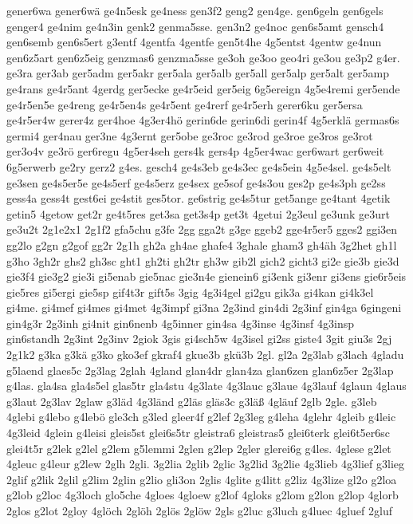 {gener6wa
gener6wä
ge4n5esk
ge4ness
gen3f2
geng2
gen4ge.
gen6geln
gen6gels
genger4
ge4nim
ge4n3in
genk2
genma5sse.
gen3n2
ge4noc
gen6s5amt
gensch4
gen6semb
gen6s5ert
g3entf
4gentfa
4gentfe
gen5t4he
4g5entst
4gentw
ge4nun
gen6z5art
gen6z5eig
genzmas6
genzma5sse
ge3oh
ge3oo
geo4ri
ge3ou
ge3p2
g4er.
ge3ra
ger3ab
ger5adm
ger5akr
ger5ala
ger5alb
ger5all
ger5alp
ger5alt
ger5amp
ge4rans
ge4r5ant
4gerdg
ger5ecke
ge4r5eid
ger5eig
6g5ereign
4g5e4remi
ger5ende
ge4r5en5e
ge4reng
ge4r5en4s
ge4r5ent
ge4rerf
ge4r5erh
gerer6ku
ger5ersa
ge4r5er4w
gerer4z
ger4hoe
4g3er4hö
gerin6de
gerin6di
gerin4f
4g5erklä
germas6s
germi4
ger4nau
ger3ne
4g3ernt
ger5obe
ge3roc
ge3rod
ge3roe
ge3ros
ge3rot
ger3o4v
ge3rö
ger6regu
4g5er4seh
gers4k
gers4p
4g5er4wac
ger6wart
ger6weit
6g5erwerb
ge2ry
gerz2
g4es.
gesch4
ge4s3eb
ge4s3ec
ge4s5ein
4g5e4sel.
ge4s5elt
ge3sen
ge4s5er5e
ge4s5erf
ge4s5erz
ge4sex
ge5sof
ge4s3ou
ges2p
ge4s3ph
ge2ss
gess4a
gess4t
gest6ei
ge4stit
ges5tor.
ge6strig
ge4s5tur
get5ange
ge4tant
4getik
getin5
4getow
get2r
ge4t5res
get3sa
get3s4p
get3t
4getui
2g3eul
ge3unk
ge3urt
ge3u2t
2g1e2x1
2g1f2
gfa5chu
g3fe
2gg
gga2t
g3ge
ggeb2
gge4r5er5
gges2
ggi3en
gg2lo
g2gn
g2gof
gg2r
2g1h
gh2a
gh4ae
ghafe4
3ghale
gham3
gh4äh
3g2het
gh1l
g3ho
3gh2r
ghs2
gh3sc
ght1
gh2ti
gh2tr
gh3w
gib2l
gich2
gicht3
gi2e
gie3b
gie3d
gie3f4
gie3g2
gie3i
gi5enab
gie5nac
gie3n4e
gienein6
gi3enk
gi3enr
gi3ens
gie6r5eis
gie5res
gi5ergi
gie5sp
gif4t3r
gift5s
3gig
4g3i4gel
gi2gu
gik3a
gi4kan
gi4k3el
gi4me.
gi4mef
gi4mes
gi4met
4g3impf
gi3na
2g3ind
gin4di
2g3inf
gin4ga
6gingeni
gin4g3r
2g3inh
gi4nit
gin6nenb
4g5inner
gin4sa
4g3inse
4g3insf
4g3insp
gin6standh
2g3int
2g3inv
2giok
3gis
gi4sch5w
4g3isel
gi2ss
giste4
3git
giu3s
2gj
2g1k2
g3ka
g3kä
g3ko
gko3ef
gkraf4
gkue3b
gkü3b
2gl.
gl2a
2g3lab
g3lach
4gladu
g5laend
glaes5c
2g3lag
2glah
4gland
glan4dr
glan4za
glan6zen
glan6z5er
2g3lap
g4las.
gla4sa
gla4s5el
glas5tr
gla4stu
4g3late
4g3lauc
g3laue
4g3lauf
4glaun
4glaus
g3laut
2g3lav
2glaw
g3läd
4g3länd
g2läs
gläs3c
g3läß
4gläuf
2glb
2gle.
g3leb
4glebi
g4lebo
g4lebö
gle3ch
g3led
gleer4f
g2lef
2g3leg
g4leha
4glehr
4gleib
g4leic
4g3leid
4glein
g4leisi
gleis5st
glei6s5tr
gleistra6
gleistras5
glei6terk
glei6t5er6sc
glei4t5r
g2lek
g2lel
g2lem
g5lemmi
2glen
g2lep
2gler
glerei6g
g4les.
4glese
g2let
4gleuc
g4leur
g2lew
2glh
2gli.
3g2lia
2glib
2glic
3g2lid
3g2lie
4g3lieb
4g3lief
g3lieg
2glif
g2lik
2glil
g2lim
2glin
g2lio
gli3on
2glis
4glite
g4litt
g2liz
4g3lize
gl2o
g2loa
g2lob
g2loc
4g3loch
glo5che
4gloes
4gloew
g2lof
4gloks
g2lom
g2lon
g2lop
4glorb
2glos
g2lot
2gloy
4glöch
2glöh
2glös
2glöw
2gls
g2luc
g3luch
g4luec
4gluef
2gluf
}
